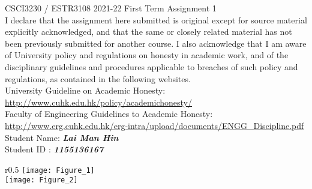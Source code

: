 \documentclass[12pt]{article}
\begin{document}
\thispagestyle{firstpage}
CSCI3230 / ESTR3108 2021-22 First Term Assignment 1\\
I declare that the assignment here submitted is original except for source material explicitly acknowledged, and that the same or closely related material has not been previously submitted for another course. I also acknowledge that I am aware of University policy and regulations on honesty in academic work, and
of the disciplinary guidelines and procedures applicable to breaches of such policy and regulations, as contained in the following websites.\\
University Guideline on Academic Honesty:\\
\url{http://www.cuhk.edu.hk/policy/academichonesty/}\\
Faculty of Engineering Guidelines to Academic Honesty:\\
\url{http://www.erg.cuhk.edu.hk/erg-intra/upload/documents/ENGG_Discipline.pdf}\\
Student Name: \textit{\textbf{Lai Man Hin}}\\
Student ID : \textit{\textbf{1155136167}}\\
\begin{wrapfigure}[13]{r}{0.5\textwidth}
\texttt{[image: Figure\_1]}\\
\texttt{[image: Figure\_2]}
\end{wrapfigure}
\end{document}
